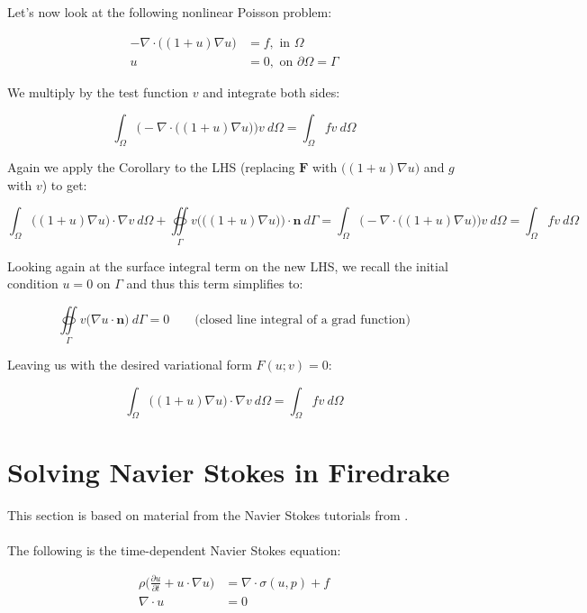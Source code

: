 \documentclass[english, 11pt]{article}
\begin{document}
  Let's now look at the following nonlinear Poisson problem: 
  
  \begin{align*}
  	- \nabla \cdot \big( (1 + u) \nabla u \big) &= f , \text{ in } \Omega \\
  	u &= 0 , \text{ on } \partial\Omega = \Gamma
  \end{align*}
  
  We multiply by the test function $v$ and integrate both sides:
  
  \[ \int_{\Omega} \Big( - \nabla \cdot \big( (1 + u) \nabla u \big) \Big) v \ d\Omega = \int_{\Omega} fv \ d\Omega \]
  
  Again we apply the Corollary to the LHS (replacing $\bm{F}$ with $\big( (1 + u) \nabla u \big)$ and $g$ with $v$) to get:
  
  \[ \int_{\Omega} \big( (1 + u) \nabla u \big) \cdot \nabla v \ d\Omega + \oiint \limits_{\Gamma} v \Big( \big( (1 + u) \nabla u \big) \Big) \cdot \bm{n} \ d\Gamma  = \int_{\Omega} \Big( - \nabla \cdot \big( (1 + u) \nabla u \big) \Big) v \ d\Omega = \int_{\Omega} fv \ d\Omega\]
  
  Looking again at the surface integral term on the new LHS, we recall the initial condition $u = 0$ on $\Gamma$ and thus this term simplifies to:
  
  \[ \oiint \limits_{\Gamma} v \big( \nabla u \cdot \bm{n} \big) \ d\Gamma  = 0 \qquad \text{(closed line integral of a grad function)}\]
  
  Leaving us with the desired variational form $F(u;v) = 0$:
  
  \[ \int_{\Omega} \big( (1 + u) \nabla u \big) \cdot \nabla v \ d\Omega = \int_{\Omega} fv \ d\Omega \]
	
\newpage
\section{Solving Navier Stokes in Firedrake}

This section is based on material from the Navier Stokes tutorials from \cite{fenics_tutorial}.\\
\\

The following is the time-dependent Navier Stokes equation:

\begin{align}
	\rho \Big( \frac{\partial u}{\partial t} + u \cdot \nabla u \Big) &= \nabla \cdot \sigma(u, p) + f \\ \label{eqn:tdns}
	\nabla \cdot u &= 0
\end{align}
\end{document}
